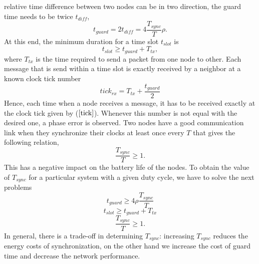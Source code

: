\documentclass[journal]{IEEEtran}
\begin{document}
relative time difference between two nodes can be in two direction,
the guard time needs to be twice $t_{diff}$,
\begin{equation}
t_{guard}= 2t_{diff} = 4\frac{T_{sync}}{T}\rho.
\end{equation}
At this end, the minimum duration for a time slot $t_{slot}$ is
\begin{equation}
t_{slot} \geq t_{guard} + T_{tx},
\end{equation}
where $T_{tx}$ is the time required to send a packet from one node to other. \newline Each message
that is send within a time slot is exactly received by a neighbor at
a known clock tick number
\begin{equation}
tick_{rx} = T_{tx}+ \frac{t_{guard}}{2} \label{tick}
\end{equation}
Hence, each time when a node receives a message, it has to be
received exactly at the clock tick given by ($\ref{tick}$). Whenever
this number is not equal with the desired one, a phase error is observed. 
\newline Two nodes have a good communication link when they synchronize
their clocks at least once every $T$ that gives the following
relation,
\begin{equation}
\frac{T_{sync}}{T}\geq 1.
\end{equation}
This has a negative impact on the battery life of the nodes. To obtain the value of
$T_{sync}$ for a particular system with a given duty cycle, we have
to solve the next problems
\begin{equation}
t_{guard} \geq 4\rho \frac{T_{sync}}{T}
\end{equation}
\begin{equation}
t_{slot} \geq t_{guard} + T_{tx}
\end{equation}
\begin{equation}
\frac{T_{sync}}{T} \geq 1.
\end{equation}
In general, there is a trade-off in determining $T_{sync}$: increasing
$T_{sync}$ reduces the energy costs of synchronization, on the other
hand we increase the cost of guard time and decrease the network
performance.
\end{document}
